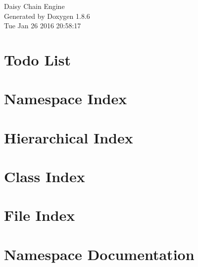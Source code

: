 \documentclass[twoside]{book}
\newcommand{\clearemptydoublepage}{%
  \newpage{\pagestyle{empty}\cleardoublepage}%
}
\begin{document}
\hypersetup{pageanchor=false}
\begin{titlepage}
\vspace*{7cm}
\begin{center}%
{\Large Daisy Chain Engine }\\
\vspace*{1cm}
{\large Generated by Doxygen 1.8.6}\\
\vspace*{0.5cm}
{\small Tue Jan 26 2016 20:58:17}\\
\end{center}
\end{titlepage}
\clearemptydoublepage
\tableofcontents
\clearemptydoublepage
{}
\hypersetup{pageanchor=true}

\chapter{Todo List}
\label{todo}
\hypertarget{todo}{}

\chapter{Namespace Index}

\chapter{Hierarchical Index}

\chapter{Class Index}

\chapter{File Index}

\chapter{Namespace Documentation}

\end{document}
